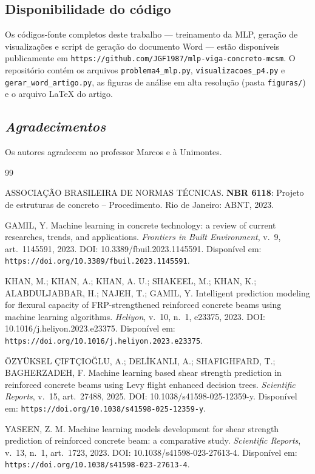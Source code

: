\documentclass[12pt,fleqn]{article}
\begin{document}
\subsection*{Disponibilidade do código}

Os códigos-fonte completos deste trabalho --- treinamento da MLP, geração de
visualizações e script de geração do documento Word --- estão disponíveis
publicamente em \texttt{https://github.com/JGF1987/mlp-viga-concreto-mcsm}.
O repositório contém os arquivos \texttt{problema4\_mlp.py},
\texttt{visualizacoes\_p4.py} e \texttt{gerar\_word\_artigo.py}, as figuras de
análise em alta resolução (pasta \texttt{figuras/}) e o arquivo \LaTeX{} do artigo.

\subsection*{\textit{Agradecimentos}}
Os autores agradecem ao professor Marcos e à Unimontes.


\begin{thebibliography}{99}
\fontsize{11}{0}\selectfont

ASSOCIAÇÃO BRASILEIRA DE NORMAS TÉCNICAS.
\textbf{NBR 6118}: Projeto de estruturas de concreto -- Procedimento.
Rio de Janeiro: ABNT, 2023.

GAMIL, Y.
Machine learning in concrete technology: a review of current researches,
trends, and applications.
\textit{Frontiers in Built Environment}, v.~9, art.~1145591, 2023.
DOI: 10.3389/fbuil.2023.1145591.
Disponível em: \texttt{https://doi.org/10.3389/fbuil.2023.1145591}.

KHAN, M.; KHAN, A.; KHAN, A. U.; SHAKEEL, M.; KHAN, K.;
ALABDULJABBAR, H.; NAJEH, T.; GAMIL, Y.
Intelligent prediction modeling for flexural capacity of FRP-strengthened
reinforced concrete beams using machine learning algorithms.
\textit{Heliyon}, v.~10, n.~1, e23375, 2023.
DOI: 10.1016/j.heliyon.2023.e23375.
Disponível em: \texttt{https://doi.org/10.1016/j.heliyon.2023.e23375}.

ÖZYÜKSEL ÇIFTÇIOĞLU, A.; DELİKANLI, A.; SHAFIGHFARD, T.;
BAGHERZADEH, F.
Machine learning based shear strength prediction in reinforced concrete
beams using Levy flight enhanced decision trees.
\textit{Scientific Reports}, v.~15, art.~27488, 2025.
DOI: 10.1038/s41598-025-12359-y.
Disponível em: \texttt{https://doi.org/10.1038/s41598-025-12359-y}.

YASEEN, Z. M.
Machine learning models development for shear strength prediction of
reinforced concrete beam: a comparative study.
\textit{Scientific Reports}, v.~13, n.~1, art.~1723, 2023.
DOI: 10.1038/s41598-023-27613-4.
Disponível em: \texttt{https://doi.org/10.1038/s41598-023-27613-4}.

\end{thebibliography}
\end{document}
